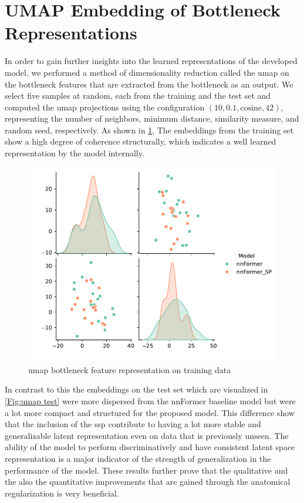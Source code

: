 \section{UMAP Embedding of Bottleneck Representations}
In order to gain further insights into the learned representations of the developed model, we performed a method of dimensionality reduction called the \gls{umap} \cite{McInnes2018} on the bottleneck features that are extracted from the bottleneck as an output. We select five samples at random, each from the training and the test set and computed the \gls{umap} projections using the configuration $(10, 0.1, \text{cosine}, 42)$, representing the number of neighbors, minimum distance, similarity measure, and random seed, respectively. As shown in \cref{Fig:umap train}, The embeddings from the training set show a high degree of coherence structurally, which indicates a well learned representation by the model internally. 

\begin{figure}[htb!] %
\centering
\centering
\includegraphics[width=1\textwidth]{images/Umap_train.pdf}
\caption{\centering \gls{umap} bottleneck feature representation on training data}
\label{Fig:umap train}
\end{figure}

In contrast to this the embeddings on the test set which are visualized in \cref{Fig:umap test} were more dispersed from the nnFormer baseline model but were a lot more compact and structured for the proposed model. This difference show that the inclusion of the \gls{ssp} contribute to having a lot more stable and generalizable latent representation even on data that is previously unseen. The ability of the model to perform discriminatively and have consistent latent space representation is a major indicator of the strength of generalization in the performance of the model. These results further prove that the qualitative and the also the quantitative improvements that are gained through the anatomical regularization is very beneficial.

